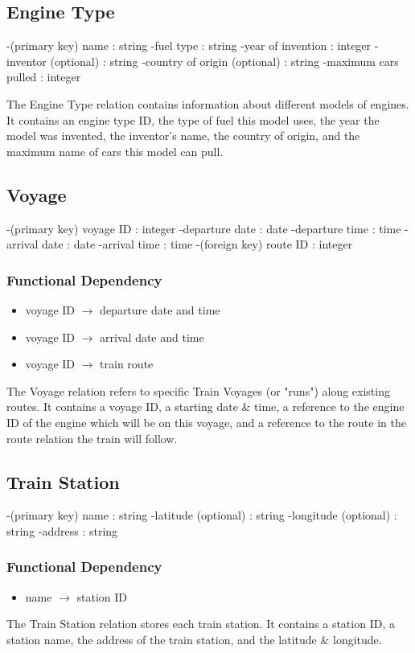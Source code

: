 \documentclass[a4paper]{article}
\begin{document}
\subsection*{Engine Type}
\begin{itemize}
-(primary key) name : string
-fuel type : string
-year of invention : integer
-inventor (optional) : string
-country of origin (optional) : string
-maximum cars pulled : integer
\end{itemize}
The Engine Type relation contains information about different models of engines. It contains an engine type ID, the type of fuel this model uses, the year the model was invented, the inventor's name, the country of origin, and the maximum name of cars this model can pull.

\subsection*{Voyage}
\begin{itemize}
-(primary key) voyage ID : integer
-departure date : date
-departure time : time
-arrival date : date
-arrival time : time
-(foreign key) route ID : integer
\end{itemize}
\subsubsection*{Functional Dependency}
\begin{itemize}
\item voyage ID $\rightarrow$ departure date and time 
\item voyage ID $\rightarrow$ arrival date and time 
\item voyage ID $\rightarrow$ train route
\end{itemize}
The Voyage relation refers to specific Train Voyages (or "runs") along existing routes. It contains a voyage ID, a starting date \& time, a reference to the engine ID of the engine which will be on this voyage, and a reference to the route in the route relation the train will follow.

\subsection*{Train Station}
\begin{itemize}
-(primary key) name : string
-latitude (optional) : string
-longitude (optional) : string
-address : string
\end{itemize}
\subsubsection*{Functional Dependency}
\begin{itemize}
\item name $\rightarrow$ station ID
\end{itemize}
The Train Station relation stores each train station. It contains a station ID, a station name, the address of the train station, and the latitude \& longitude.
\end{document}
